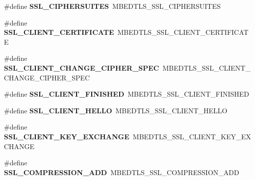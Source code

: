 \begin{DoxyCompactItemize}
\item 
\mbox{\label{compat-1_83_8h_af73cc539c9d46097e9cb75a5bfc43393}} 
\#define {\bfseries S\+S\+L\+\_\+\+C\+I\+P\+H\+E\+R\+S\+U\+I\+T\+ES}~M\+B\+E\+D\+T\+L\+S\+\_\+\+S\+S\+L\+\_\+\+C\+I\+P\+H\+E\+R\+S\+U\+I\+T\+ES
\item 
\mbox{\label{compat-1_83_8h_adf2fc74b4933832f25d1dc677c6a3c3c}} 
\#define {\bfseries S\+S\+L\+\_\+\+C\+L\+I\+E\+N\+T\+\_\+\+C\+E\+R\+T\+I\+F\+I\+C\+A\+TE}~M\+B\+E\+D\+T\+L\+S\+\_\+\+S\+S\+L\+\_\+\+C\+L\+I\+E\+N\+T\+\_\+\+C\+E\+R\+T\+I\+F\+I\+C\+A\+TE
\item 
\mbox{\label{compat-1_83_8h_a5e7926619a99f463b0c99c94a1384b9b}} 
\#define {\bfseries S\+S\+L\+\_\+\+C\+L\+I\+E\+N\+T\+\_\+\+C\+H\+A\+N\+G\+E\+\_\+\+C\+I\+P\+H\+E\+R\+\_\+\+S\+P\+EC}~M\+B\+E\+D\+T\+L\+S\+\_\+\+S\+S\+L\+\_\+\+C\+L\+I\+E\+N\+T\+\_\+\+C\+H\+A\+N\+G\+E\+\_\+\+C\+I\+P\+H\+E\+R\+\_\+\+S\+P\+EC
\item 
\mbox{\label{compat-1_83_8h_a2fd0f5a62a2c6fefcc292f01f766f280}} 
\#define {\bfseries S\+S\+L\+\_\+\+C\+L\+I\+E\+N\+T\+\_\+\+F\+I\+N\+I\+S\+H\+ED}~M\+B\+E\+D\+T\+L\+S\+\_\+\+S\+S\+L\+\_\+\+C\+L\+I\+E\+N\+T\+\_\+\+F\+I\+N\+I\+S\+H\+ED
\item 
\mbox{\label{compat-1_83_8h_a7bcc31c04ff8bf761b834f56ff64ce6b}} 
\#define {\bfseries S\+S\+L\+\_\+\+C\+L\+I\+E\+N\+T\+\_\+\+H\+E\+L\+LO}~M\+B\+E\+D\+T\+L\+S\+\_\+\+S\+S\+L\+\_\+\+C\+L\+I\+E\+N\+T\+\_\+\+H\+E\+L\+LO
\item 
\mbox{\label{compat-1_83_8h_a2f1d39a5a96e9586c71de1d8cbbcac41}} 
\#define {\bfseries S\+S\+L\+\_\+\+C\+L\+I\+E\+N\+T\+\_\+\+K\+E\+Y\+\_\+\+E\+X\+C\+H\+A\+N\+GE}~M\+B\+E\+D\+T\+L\+S\+\_\+\+S\+S\+L\+\_\+\+C\+L\+I\+E\+N\+T\+\_\+\+K\+E\+Y\+\_\+\+E\+X\+C\+H\+A\+N\+GE
\item 
\mbox{\label{compat-1_83_8h_a63d3eb06371fa59f67919f105e4affd8}} 
\#define {\bfseries S\+S\+L\+\_\+\+C\+O\+M\+P\+R\+E\+S\+S\+I\+O\+N\+\_\+\+A\+DD}~M\+B\+E\+D\+T\+L\+S\+\_\+\+S\+S\+L\+\_\+\+C\+O\+M\+P\+R\+E\+S\+S\+I\+O\+N\+\_\+\+A\+DD
\item 
\mbox{\label{compat-1_83_8h_ae4b89da0e77356598f12b3d48506276d}} 

\end{DoxyCompactItemize}
